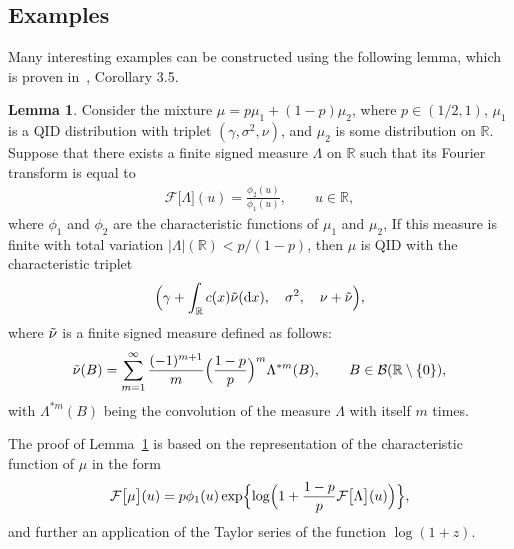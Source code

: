 \documentclass[a4paper,11pt]{article}
\theoremstyle{definition}
\newcommand{\R}{{\mathbb{R}}}
\newcommand{\1}{\mathbb{I}}
\def\R{\mathbb{R}}
\newcommand{\B}{\mathcal{B}}%
\newcommand{\F}{\mathcal{F}}
\newtheorem{lem}{Lemma}
\theoremstyle{remark}
\begin{document}
\subsection{Examples}\label{sec22} 

Many interesting examples can be constructed using the following lemma, which is proven in~\cite{LPS2018}, Corollary 3.5.

\begin{lem} \label{magic_lem1}
Consider the mixture $\mu = p\mu_1 + (1-p)\mu_2$, where  $p \in (1/2, 1)$,  $\mu_1$ is a QID distribution with  triplet $(\gamma, \sigma^2, \nu)$, and $\mu_2$ is some distribution on \(\R.\) Suppose  that there exists a finite signed measure $\Lambda$ on $\mathbb{R}$ such that its Fourier transform is equal to 
\begin{eqnarray}\label{mu12}
\F\bigl[\Lambda \bigr](u) = \frac{\phi_2(u)}{\phi_1(u)}, \qquad u \in \R,
\end{eqnarray}
where   $\phi_1$ and $\phi_2$ are the characteristic functions of $\mu_1$ and $\mu_2$, If this measure is finite with total variation $|\Lambda|(\mathbb{R}) < p/(1-p)$, then $\mu$ is QID with the characteristic triplet \[\Bigl(\gamma + \int_{\mathbb{R}}c(x)\Tilde{\nu}(\mathrm{d}x),  \quad \sigma^2, \quad  \nu + \Tilde{\nu}\Bigr),\]
where $\Tilde{\nu}$ is a finite signed measure defined as follows: 
\begin{equation}\label{Tildenu}
    \Tilde{\nu}(B) = \sum_{m = 1}^{\infty} \frac{(-1)^{m + 1}}{m}\Bigl( 
\frac{1-p}{p} 
\Bigr)^m\Lambda^{*m}(B), \qquad B \in \B(\R\setminus\{0\}),
\end{equation}
with $\Lambda^{*m}(B)$ being the convolution of the measure $\Lambda$ with itself  $m$ times.\end{lem}
The proof of Lemma~\ref{magic_lem1} is based on the representation of the characteristic function of \(\mu\) in the form 
\begin{eqnarray*}
\F\bigl[
\mu 
\bigr](u) 
=
p \phi_1(u)
\exp\Bigl\{
\log
\Bigl(
1+ 
\frac{1-p}{p} 
\F\bigl[
\Lambda
\bigr](u) \Bigr)
\Bigr\},
\end{eqnarray*}
and further an application of the Taylor series of the function \(\log(1+z).\)


%
%
\end{document}
